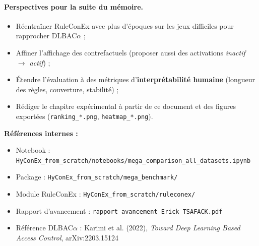 \documentclass[11pt,a4paper]{article}
\begin{document}
\paragraph{Perspectives pour la suite du mémoire.}
\begin{itemize}
  \item Réentraîner RuleConEx avec plus d'époques sur les jeux difficiles pour rapprocher DLBAC$\alpha$ ;
  \item Affiner l'affichage des contrefactuels (proposer aussi des activations \emph{inactif $\to$ actif}) ;
  \item Étendre l'évaluation à des métriques d'\textbf{interprétabilité humaine} (longueur des règles, couverture, stabilité) ;
  \item Rédiger le chapitre expérimental à partir de ce document et des figures exportées (\texttt{ranking\_*.png}, \texttt{heatmap\_*.png}).
\end{itemize}

\vspace{1em}
\noindent
\textbf{Références internes :}
\begin{itemize}
  \item Notebook : \texttt{HyConEx\_from\_scratch/notebooks/mega\_comparison\_all\_datasets.ipynb}
  \item Package : \texttt{HyConEx\_from\_scratch/mega\_benchmark/}
  \item Module RuleConEx : \texttt{HyConEx\_from\_scratch/ruleconex/}
  \item Rapport d'avancement : \texttt{rapport\_avancement\_Erick\_TSAFACK.pdf}
  \item Référence DLBAC$\alpha$ : Karimi et al. (2022), \emph{Toward Deep Learning Based Access Control}, arXiv:2203.15124
\end{itemize}
\end{document}
